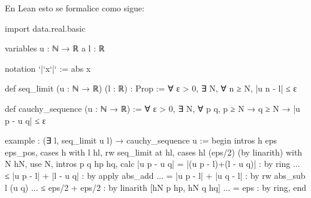 En Lean esto se formalice como sigue:
\begin{leancode}
import data.real.basic

variables {u : ℕ → ℝ} {a l : ℝ}

notation `|`x`|` := abs x

def seq_limit (u : ℕ → ℝ) (l : ℝ) : Prop :=
∀ ε > 0, ∃ N, ∀ n ≥ N, |u n - l| ≤ ε

def cauchy_sequence (u : ℕ → ℝ) := 
∀ ε > 0, ∃ N, ∀ p q, p ≥ N → q ≥ N → |u p - u q| ≤ ε

example : (∃ l, seq_limit u l) → cauchy_sequence u :=
begin
intros h eps eps_pos,
cases h with l hl,
rw seq_limit at hl,
cases hl (eps/2) (by linarith) with N hN,
use N,
  intros p q hp hq,
calc  |u p - u q| 
    = |(u p - l)+(l - u q)|  : by ring
... ≤ |u p - l| + |l - u q|  : by apply abs_add
... = |u p - l| + |u q - l|  : by rw abs_sub l (u q)
... ≤ eps/2 + eps/2          : by linarith [hN p hp, hN q hq]
... = eps                    : by ring,
end
\end{leancode}

